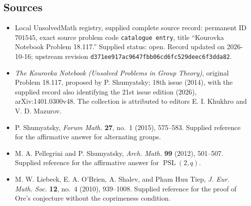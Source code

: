 \documentclass[11pt]{article}
\begin{document}
\subsection{Sources}
\begin{itemize}
\item Local UnsolvedMath registry, supplied complete source record: permanent ID \(701545\), exact source problem code \texttt{catalogue entry}, title ``Kourovka Notebook Problem 18.117.'' Supplied status: open. Record updated on 2026-10-16; upstream revision \texttt{d371ee917ac9647fbb06cd6fc529deec6f3dda82}.
\item \textit{The Kourovka Notebook (Unsolved Problems in Group Theory)}, original Problem 18.117, proposed by P. Shumyatsky; 18th issue (2014), with the supplied record also identifying the 21st issue edition (2026), arXiv:1401.0300v48. The collection is attributed to editors E. I. Khukhro and V. D. Mazurov.
\item P. Shumyatsky, \textit{Forum Math.} \textbf{27}, no.\ 1 (2015), 575--583. Supplied reference for the affirmative answer for alternating groups.
\item M. A. Pellegrini and P. Shumyatsky, \textit{Arch. Math.} \textbf{99} (2012), 501--507. Supplied reference for the affirmative answer for \(\operatorname{PSL}(2,q)\).
\item M. W. Liebeck, E. A. O'Brien, A. Shalev, and Pham Huu Tiep, \textit{J. Eur. Math. Soc.} \textbf{12}, no.\ 4 (2010), 939--1008. Supplied reference for the proof of Ore's conjecture without the coprimeness condition.
\end{itemize}
\end{document}
